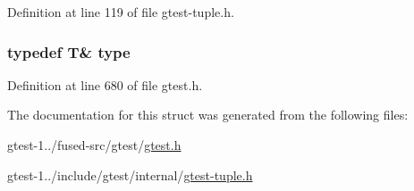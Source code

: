 \-Definition at line 119 of file gtest-\/tuple.\-h.

\hypertarget{structstd_1_1tr1_1_1gtest__internal_1_1ByRef_3_01T_01_6_01_4_a08e05528fbb401bd8299a21d67d13ee3}{
\subsubsection[{type}]{\setlength{\rightskip}{0pt plus 5cm}typedef \-T\& {\bf type}}}\label{df/de2/structstd_1_1tr1_1_1gtest__internal_1_1ByRef_3_01T_01_6_01_4_a08e05528fbb401bd8299a21d67d13ee3}


\-Definition at line 680 of file gtest.\-h.



\-The documentation for this struct was generated from the following files\-:\begin{DoxyCompactItemize}
\item 
gtest-\/1../fused-\/src/gtest/\hyperlink{fused-src_2gtest_2gtest_8h}{gtest.\-h}\item 
gtest-\/1../include/gtest/internal/\hyperlink{gtest-tuple_8h}{gtest-\/tuple.\-h}\end{DoxyCompactItemize}

